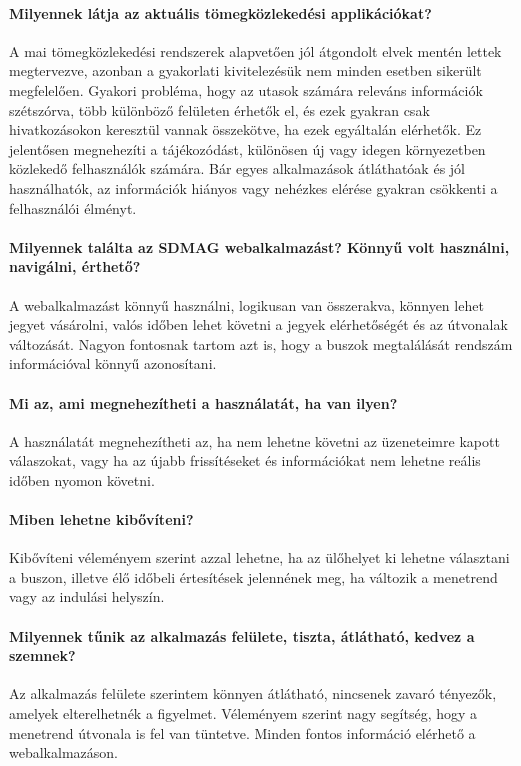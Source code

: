 \paragraph*{Milyennek látja az aktuális tömegközlekedési applikációkat?}

A mai tömegközlekedési rendszerek alapvetően jól átgondolt elvek mentén lettek megtervezve, azonban a gyakorlati kivitelezésük nem minden esetben sikerült megfelelően. Gyakori probléma, hogy az utasok számára releváns információk szétszórva, több különböző felületen érhetők el, és ezek gyakran csak hivatkozásokon keresztül vannak összekötve, ha ezek egyáltalán elérhetők. Ez jelentősen megnehezíti a tájékozódást, különösen új vagy idegen környezetben közlekedő felhasználók számára. Bár egyes alkalmazások átláthatóak és jól használhatók, az információk hiányos vagy nehézkes elérése gyakran csökkenti a felhasználói élményt.

\paragraph*{Milyennek találta az SDMAG webalkalmazást? Könnyű volt használni, navigálni, érthető?}

A webalkalmazást könnyű használni, logikusan van összerakva, könnyen lehet jegyet vásárolni, valós időben lehet követni a jegyek elérhetőségét és az útvonalak változását. Nagyon fontosnak tartom azt is, hogy a buszok megtalálását rendszám információval könnyű azonosítani.

\paragraph*{Mi az, ami megnehezítheti a használatát, ha van ilyen?}

A használatát megnehezítheti az, ha nem lehetne követni az üzeneteimre kapott válaszokat, vagy ha az újabb frissítéseket és információkat nem lehetne reális időben nyomon követni.

\paragraph*{Miben lehetne kibővíteni?}

Kibővíteni véleményem szerint azzal lehetne, ha az ülőhelyet ki lehetne választani a buszon, illetve élő időbeli értesítések jelennének meg, ha változik a menetrend vagy az indulási helyszín.

\paragraph*{Milyennek tűnik az alkalmazás felülete, tiszta, átlátható, kedvez a szemnek?}

Az alkalmazás felülete szerintem könnyen átlátható, nincsenek zavaró tényezők, amelyek elterelhetnék a figyelmet. Véleményem szerint nagy segítség, hogy a menetrend útvonala is fel van tüntetve. Minden fontos információ elérhető a webalkalmazáson.
